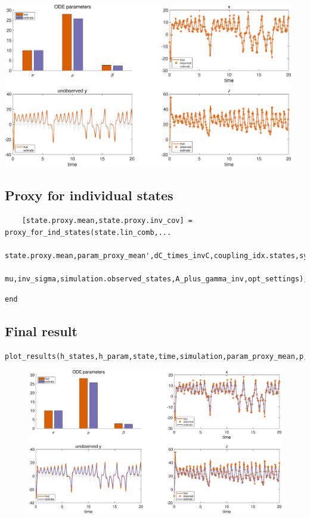 {\includegraphics [width=5in]{Lorenz_attractor_4_44.eps}
}

\subsection{ Proxy for individual states }

\color{RoyalPurple}\begin{verbatim}
    [state.proxy.mean,state.proxy.inv_cov] = proxy_for_ind_states(state.lin_comb,...
        state.proxy.mean,param_proxy_mean',dC_times_invC,coupling_idx.states,symbols,...
        mu,inv_sigma,simulation.observed_states,A_plus_gamma_inv,opt_settings);
\end{verbatim}
\color{black}
\color{RoyalPurple}\begin{verbatim}
end
\end{verbatim}
\color{black}
\begin{par}
\subsection{ Final result }
\end{par} \vspace{1em}
\color{RoyalPurple}\begin{verbatim}
plot_results(h_states,h_param,state,time,simulation,param_proxy_mean,p,symbols,'final');
\end{verbatim}
\color{black}

\begin{figure}[tbh!]
\centering
\includegraphics [width=5in]{Lorenz_attractor_4_45.eps}
\end{figure}

